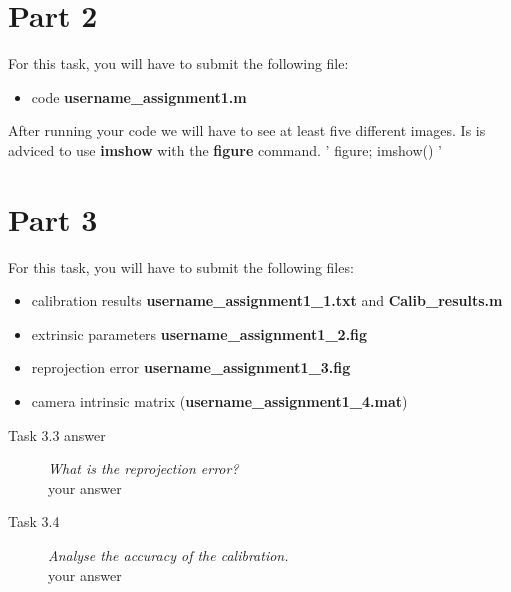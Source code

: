 \documentclass[a4paper, oneside]{article}
\begin{document}
	\section*{Part 2}
	For this task, you will have to submit the following file:
    \begin{itemize}
    \item code \textbf{username\_assignment1.m}
    \end{itemize}
    After running your code we will have to see at least five different images. Is is adviced to use \textbf{imshow} with the \textbf{figure} command. ' figure; imshow() '

	\section*{Part 3}
	For this task, you will have to submit the following files:
\begin{itemize}
    \item calibration results \textbf{username\_assignment1\_1.txt} and \textbf{Calib\_results.m}
    \item extrinsic parameters \textbf{username\_assignment1\_2.fig}
    \item reprojection error \textbf{username\_assignment1\_3.fig}
    \item camera intrinsic matrix  (\textbf{username\_assignment1\_4.mat})
\end{itemize}

    \begin{description}
	\item[Task 3.3 answer] \emph{What is the reprojection error?} \\your answer
	\end{description}
	
	
	\begin{description}
	\item[Task 3.4 ] \emph{Analyse the accuracy of the calibration.}\\your answer
	\end{description}
	
\end{document}
